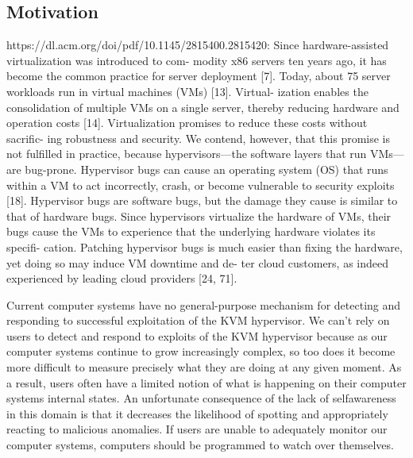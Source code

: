 \documentclass{report}
\begin{document}
\begin{spacing}{1.5}









































\section{Motivation}
https://dl.acm.org/doi/pdf/10.1145/2815400.2815420:
Since hardware-assisted virtualization was introduced to com-
modity x86 servers ten years ago, it has become the common
practice for server deployment [7]. Today, about 75%
server workloads run in virtual machines (VMs) [13]. Virtual-
ization enables the consolidation of multiple VMs on a single
server, thereby reducing hardware and operation costs [14].
Virtualization promises to reduce these costs without sacrific-
ing robustness and security. We contend, however, that this
promise is not fulfilled in practice, because hypervisors—the
software layers that run VMs—are bug-prone. Hypervisor
bugs can cause an operating system (OS) that runs within a
VM to act incorrectly, crash, or become vulnerable to security
exploits [18].
Hypervisor bugs are software bugs, but the damage they
cause is similar to that of hardware bugs. Since hypervisors
virtualize the hardware of VMs, their bugs cause the VMs to
experience that the underlying hardware violates its specifi-
cation. Patching hypervisor bugs is much easier than fixing
the hardware, yet doing so may induce VM downtime and de-
ter cloud customers, as indeed experienced by leading cloud
providers [24, 71].





{\large
Current computer systems have no general-purpose mechanism for
detecting and responding to successful exploitation of the KVM hypervisor. We can't rely on users to detect and respond to exploits of the KVM hypervisor because as our computer systems continue to grow increasingly complex, so too does it
become more difficult to measure precisely what they are doing at any given moment.
As a result, users often have a limited notion of what is happening on their computer
systems internal states. An unfortunate consequence of the lack of selfawareness in
this domain is that it decreases the likelihood of spotting and appropriately reacting
to malicious anomalies. If users are unable to adequately monitor our computer
systems, computers should be programmed to watch over themselves.
\newline
}







\end{spacing}
\end{document}
